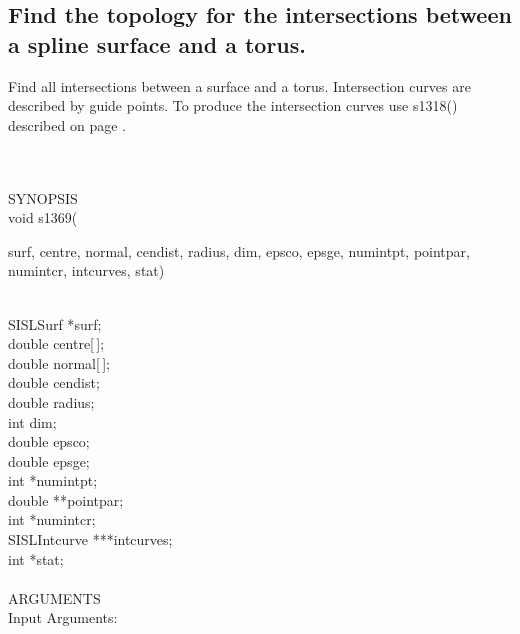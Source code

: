 \subsection{Find the topology for the intersections between a spline surface and a \mbox{torus}.}
\begin{minipg1}
  Find all intersections between a surface and a torus.
  Intersection curves are described by guide points.
  To produce the intersection curves use s1318() described on page \pageref{s1318}.
\end{minipg1} \\ \\
SYNOPSIS\\
        \>void s1369(\begin{minipg3}
                {\fov surf}, {\fov centre}, {\fov normal}, {\fov cendist}, {\fov radius}, {\fov dim}, {\fov epsco},
                {\fov epsge}, {\fov \linebreak}
                {\fov numintpt}, {\fov pointpar}, {\fov numintcr}, {\fov intcurves}, {\fov stat})
                \end{minipg3}\\[0.3ex]
                \>\>    SISLSurf        \>      *{\fov surf};\\
                \>\>    double  \>      {\fov centre}[\,];\\
                \>\>    double  \>      {\fov normal}[\,];\\
                \>\>    double  \>      {\fov cendist};\\
                \>\>    double  \>      {\fov radius};\\
                \>\>    int     \>      {\fov dim};\\
                \>\>    double  \>      {\fov epsco};\\
                \>\>    double  \>      {\fov epsge};\\
                \>\>    int     \>      *{\fov numintpt};\\
                \>\>    double  \>      **{\fov pointpar};\\
                \>\>    int     \>      *{\fov numintcr};\\
                \>\>    SISLIntcurve\>  ***{\fov intcurves};\\
                \>\>    int     \>      *{\fov stat};\\
\\
ARGUMENTS\\
        \>Input Arguments:\\
